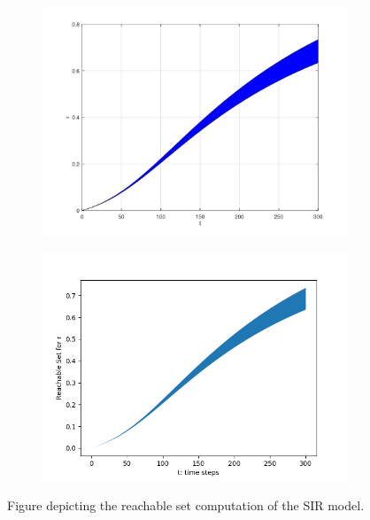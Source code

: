 \documentclass[EPiC]{easychair}
\begin{document}
\begin{figure}[h]
    \begin{subfigure}{0.5\textwidth}
    \centering
    \includegraphics[width=\textwidth]{SapoFigures/SIR/SapoSIR_R.jpg}
    \end{subfigure}
    \begin{subfigure}{0.6\textwidth}
    \centering
    \includegraphics[width=\textwidth]{SapoFigures/SIR/KaaSIR_R.png}
    \end{subfigure}
    
    \caption{Figure depicting the reachable set computation of the SIR model.} 
    \label{fig1}
\end{figure}
\end{document}
